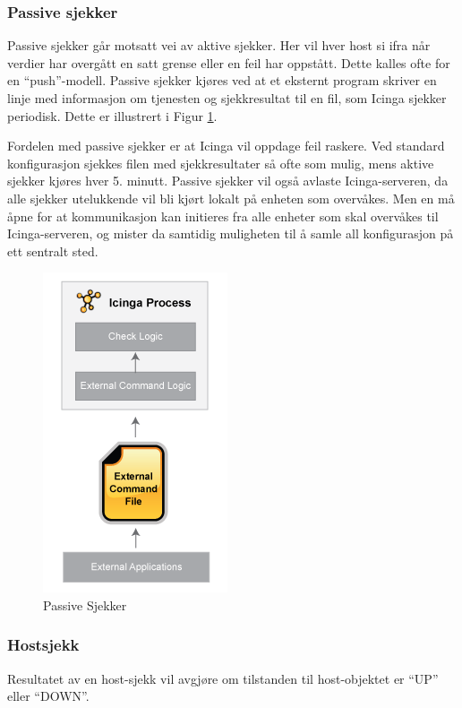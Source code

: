 \subsubsection{Passive sjekker}
Passive sjekker går motsatt vei av aktive sjekker. Her vil hver host si ifra når verdier har overgått en satt grense eller en feil har oppstått. Dette kalles ofte for en ``push''-modell. Passive sjekker kjøres ved at et eksternt program skriver en linje med informasjon om tjenesten og sjekkresultat til en fil, som Icinga sjekker periodisk. Dette er illustrert i Figur \ref{passive_checks}.

Fordelen med passive sjekker er at Icinga vil oppdage feil raskere. Ved standard konfigurasjon sjekkes filen med sjekkresultater så ofte som mulig, mens aktive sjekker kjøres hver 5. minutt. Passive sjekker vil også avlaste Icinga-serveren, da alle sjekker utelukkende vil bli kjørt lokalt på enheten som overvåkes. Men en må åpne for at kommunikasjon kan initieres fra alle enheter som skal overvåkes til Icinga-serveren, og mister da samtidig muligheten til å samle all konfigurasjon på ett sentralt sted. 

\begin{figure}[H]
    \centering
    \includegraphics[scale=0.7]{img/passivechecks.png}
    \caption{Passive Sjekker}
    \label{passive_checks}
\end{figure}

\subsubsection{Hostsjekk}
Resultatet av en host-sjekk vil avgjøre om tilstanden til host-objektet er ``UP'' eller ``DOWN''. 


